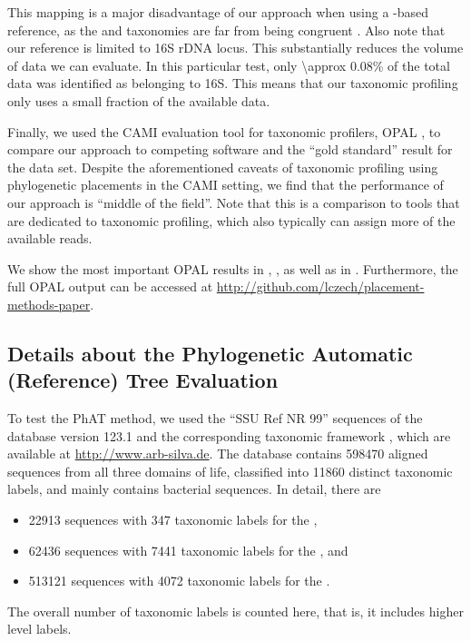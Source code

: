 This mapping is a major disadvantage of our approach when using a -based reference,
as the  and  taxonomies are far from being congruent \citep{Balvociute2017}.
Also note that our reference is limited to 16S rDNA locus. This substantially reduces the volume of data we can evaluate.
In this particular test, only \num{\approx 0.08}\% of the total data was identified as belonging to 16S.
This means that our taxonomic profiling only uses a small fraction of the available data.

Finally, we used the CAMI evaluation tool for taxonomic profilers, OPAL \citep{Sczyrba2017},
to compare our approach to competing software and the ``gold standard'' result for the data set.
Despite the aforementioned caveats of taxonomic profiling using phylogenetic placements in the CAMI setting,
we find that the performance of our approach is ``middle of the field''.
Note that this is a comparison to tools that are dedicated to taxonomic profiling,
which also typically can assign more of the available reads.

We show the most important OPAL results in , ,
as well as in .
Furthermore, the full OPAL output can be accessed at \url{http://github.com/lczech/placement-methods-paper}.


\subsection{Details about the Phylogenetic Automatic (Reference) Tree Evaluation}
\label{sec:DetailsEvaluationReferenceTrees}

To test the \acf{PhAT} method,
we used the ``SSU Ref NR 99'' sequences of the  database \citep{Quast2013} version 123.1
and the corresponding taxonomic framework \citep{Yilmaz2014}, which are available at \url{http://www.arb-silva.de}.
The database contains \num{598 470} aligned sequences from all three domains of life,
classified into \num{11 860} distinct taxonomic labels,
and mainly contains bacterial sequences.
In detail, there are
\begin{itemize}
    \item \num{ 22 913} sequences with \num{  347} taxonomic labels for the ,
    \item \num{ 62 436} sequences with \num{7 441} taxonomic labels for the , and
    \item \num{513 121} sequences with \num{4 072} taxonomic labels for the .
\end{itemize}
The overall number of taxonomic labels is counted here, that is, it includes higher level labels.

